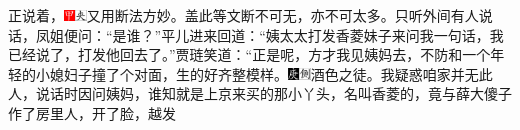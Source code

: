 正说着，{\includegraphics[width=3mm]{../Images/00002}\includegraphics[width=3mm]{../Images/00012}\footnotesize \kaishu 又用断法方妙。盖此等文断不可无，亦不可太多。}只听外间有人说话，凤姐便问：``是谁？''平儿进来回道：``姨太太打发香菱妹子来问我一句话，我已经说了，打发他回去了。''贾琏笑道：``正是呢，方才我见姨妈去，不防和一个年轻的小媳妇子撞了个对面，生的好齐整模样。{\includegraphics[width=3mm]{../Images/00004}\includegraphics[width=3mm]{../Images/00011}\footnotesize \kaishu 酒色之徒。}我疑惑咱家并无此人，说话时因问姨妈，谁知就是上京来买的那小丫头，名叫香菱的，竟与薛大傻子作了房里人，开了脸，越发